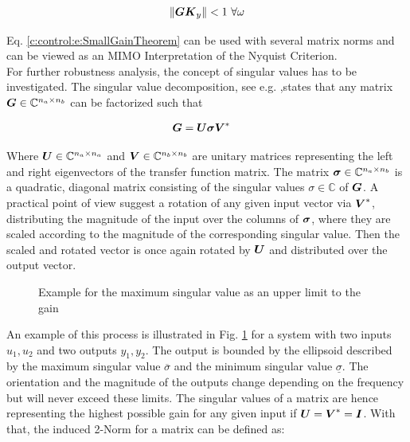 \begin{align}
\lVert \mbox{\boldmath$G$} \mbox{\boldmath$K$}_y \rVert < 1 ~\forall \omega
\label{c:control:e:SmallGainTheorem}
\end{align}

Eq. \ref{c:control:e:SmallGainTheorem} can be used with several matrix norms and can be viewed as an MIMO Interpretation of the Nyquist Criterion. \\

For further robustness analysis, the concept of singular values has to be investigated. The singular value decomposition, see e.g. \cite[p.144 f.]{Zeidler2013},states that any matrix $\mbox{\boldmath$G$} \in \mathbb{C}^{n_a\times n_b}$ can be factorized such that

\begin{align}
\mbox{\boldmath$G$} &= \mbox{\boldmath$U$}\mbox{\boldmath$\sigma$}\mbox{\boldmath$V$}^*
\label{c:control:e:SVD}
\end{align}

Where $\mbox{\boldmath$U$} \in \mathbb{C}^{n_a \times n_a}$ and $\mbox{\boldmath$V$} \in \mathbb{C}^{n_b \times n_b} $ are unitary matrices representing the left and right eigenvectors of the transfer function matrix. The matrix $\mbox{\boldmath$\sigma$} \in \mathbb{C}^{n_a \times n_b}$ is a quadratic, diagonal matrix consisting of the singular values $\sigma \in \mathbb{C}$ of $\mbox{\boldmath$G$}$. A practical point of view suggest a rotation of any given input vector via $\mbox{\boldmath$V$}^*$, distributing the magnitude of the input over the columns of $\mbox{\boldmath$\sigma$}$, where they are scaled according to the magnitude of the corresponding singular value. Then the scaled and rotated vector is once again rotated by $\mbox{\boldmath$U$}$ and distributed over the output vector. \\

\begin{figure}[H]
\begin{minipage}[b]{\textwidth}
\centering

\caption{Example for the maximum singular value as an upper limit to the gain}
\label{c:control:f:SVD}
\end{minipage}
\end{figure}


An example of this process is illustrated in Fig. \ref{c:control:f:SVD} for a system with two inputs $u_1,u_2$ and two outputs $y_1,y_2$. The output is bounded by the ellipsoid described by the maximum singular value $\overline{\sigma}$ and the minimum singular value $\underline{\sigma}$. The orientation and the magnitude of the outputs change depending on the frequency but will never exceed these limits. The singular values of a matrix are hence representing the highest possible gain for any given input if $\mbox{\boldmath$U$} = \mbox{\boldmath$V$}^* = \mbox{\boldmath$I$}$. With that, the induced 2-Norm for a matrix can be defined as:

